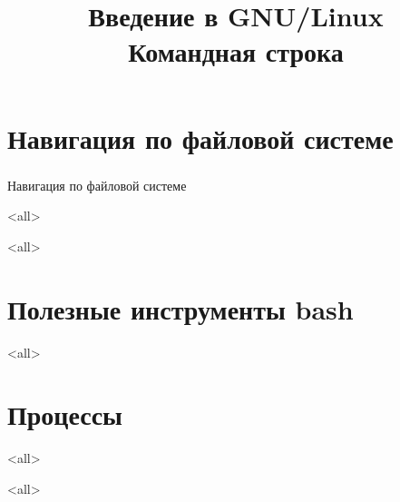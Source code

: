 
\title{Введение в GNU/Linux\\Командная строка}


\begin{frame}
 \frametitle{}
 \titlepage
\end{frame}

\section{ Навигация по файловой системе}
\begin{frame}
\frametitle{}
 \begin{center}
   {\Large Навигация по файловой системе }
 \end{center}
\end{frame}
\mode<all>{}

\mode<all>{}

\section{Полезные инструменты bash}
\mode<all>{}

\section{Процессы}
\mode<all>{}

\mode<all>

